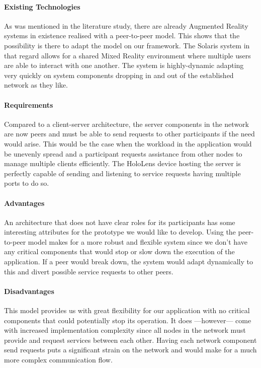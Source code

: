 \paragraph{Existing Technologies}
As was mentioned in the literature study, there are already Augmented Reality systems in existence realised with a peer-to-peer model. This shows that the possibility is there to adapt the model on our framework. The Solaris system\cite{keller2002toward} in that regard allows for a shared Mixed Reality environment where multiple users are able to interact with one another. The system is highly-dynamic adapting very quickly on system components dropping in and out of the established network as they like.

\paragraph{Requirements}
Compared to a client-server architecture, the server components in the network are now peers and must be able to send requests to other participants if the need would arise. This would be the case when the workload in the application would be unevenly spread and a participant requests assistance from other nodes to manage multiple clients efficiently. The HoloLens device hosting the server is perfectly capable of sending and listening to service requests having multiple ports to do so. 


\paragraph{Advantages}
An architecture that does not have clear roles for its participants has some interesting attributes for the prototype we would like to develop. Using the peer-to-peer model makes for a more robust and flexible system since we don't have any critical components that would stop or slow down the execution of the application. If a peer would break down, the system would adapt dynamically to this and divert possible service requests to other peers.

\paragraph{Disadvantages}
This model provides us with great flexibility for our application with no critical components that could potentially stop its operation. It does ---however--- come with increased implementation complexity since all nodes in the network must provide and request services between each other.
Having each network component send requests puts a significant strain on the network and would make for a much more complex communication flow.

